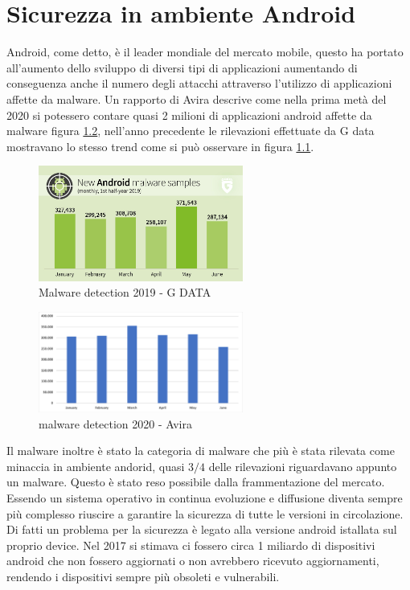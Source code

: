 \chapter{Sicurezza in ambiente Android}
Android, come detto, è il leader mondiale del mercato mobile, questo ha portato all'aumento dello sviluppo di diversi tipi di applicazioni aumentando di conseguenza anche il numero degli attacchi attraverso l'utilizzo di applicazioni affette da malware. Un rapporto di Avira descrive come nella prima metà del 2020 si potessero contare quasi 2 milioni di applicazioni android affette da malware\cite{newMalwareAvira} figura \ref{fig:avira}, nell'anno precedente le rilevazioni effettuate da G data mostravano lo stesso trend\cite{newMalware} come si può osservare in figura \ref{fig:GSATA}. 
     \begin{figure}[h]
        \centering
        \includegraphics[width=0.6\textwidth]{imgs/capitolo3/G_DATA-Infographic-MMR-HJ1-2019-New_Android_Malware-monthly-EN-Logo.jpg}
        \caption{Malware detection 2019 - G DATA}
        \label{fig:GSATA}
\end{figure}
\FloatBarrier %
\begin{figure}[h]
        \centering
        \includegraphics[width=0.6\textwidth]{imgs/capitolo3/avira.png}
        \caption{malware detection 2020 - Avira}
        \label{fig:avira}
        \end{figure}
\FloatBarrier %
Il malware inoltre è stato la categoria di malware che più è stata rilevata come minaccia in ambiente andorid, quasi $3/4$ delle rilevazioni riguardavano appunto un malware\cite{newMalwareAvira}.
Questo è stato reso possibile dalla frammentazione del mercato. Essendo un sistema operativo in continua evoluzione e diffusione diventa sempre più complesso riuscire a garantire la sicurezza di tutte le versioni in circolazione. Di fatti un problema per la sicurezza è legato alla versione android istallata sul proprio device. Nel 2017 si stimava ci fossero circa 1 miliardo di dispositivi android che non fossero aggiornati o non avrebbero ricevuto aggiornamenti, rendendo i dispositivi sempre più obsoleti e vulnerabili\cite{oneMilion}. 


